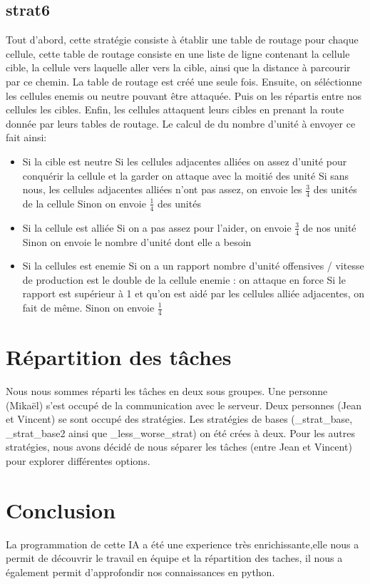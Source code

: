 \documentclass{rapport}
\begin{document}
		\section{strat6}
			Tout d'abord, cette stratégie consiste à établir une table de routage pour chaque cellule, cette table de routage consiste en une liste de ligne contenant la cellule cible, la cellule vers laquelle aller vers la cible, ainsi que la distance à parcourir par ce chemin. La table de routage est créé une seule fois.
			Ensuite, on séléctionne les cellules enemis ou neutre pouvant être attaquée. Puis on les répartis entre nos cellules les cibles.
			Enfin, les cellules attaquent leurs cibles en prenant la route donnée par leurs tables de routage.
			Le calcul de du nombre d'unité à envoyer ce fait ainsi:
			\begin{itemize}
					\item Si la cible est neutre
						\subitem Si les cellules adjacentes alliées on assez d'unité pour conquérir la cellule et la garder on attaque avec la moitié des unité
						\subitem Si sans nous, les cellules adjacentes alliées n'ont pas assez, on envoie les $\frac{3}{4}$ des unités de la cellule
						\subitem Sinon on envoie $\frac{1}{4}$ des unités
					\item Si la cellule est alliée
						\subitem Si on a pas assez pour l'aider, on envoie $\frac{3}{4}$ de nos unité
						\subitem Sinon on envoie le nombre d'unité dont elle a besoin
					\item Si la cellules est enemie
						\subitem Si on a un rapport nombre d'unité offensives / vitesse de production est le double de la cellule enemie : on attaque en force
						\subitem Si le rapport est supérieur à 1 et qu'on est aidé par les cellules alliée adjacentes, on fait de même.
						\subitem Sinon on envoie $\frac{1}{4}$
			\end{itemize}
	\chapter{Répartition des tâches}
		Nous nous sommes réparti les tâches en deux sous groupes. Une personne (Mikaël) s'est occupé de la communication
		avec le serveur. Deux personnes (Jean et Vincent) se sont occupé des stratégies. Les stratégies de bases (\_strat\_base, \_strat\_base2 ainsi que \_less\_worse\_strat) on été crées à deux. Pour les autres stratégies, nous avons décidé de nous séparer les tâches (entre Jean et Vincent) pour explorer différentes options.
	\chapter*{Conclusion}
La programmation de cette IA a été une experience très enrichissante,elle nous a permit de découvrir le travail en équipe et la répartition des taches, 
il nous a également permit d'approfondir nos connaissances en python.
	\printindex
\end{document}

